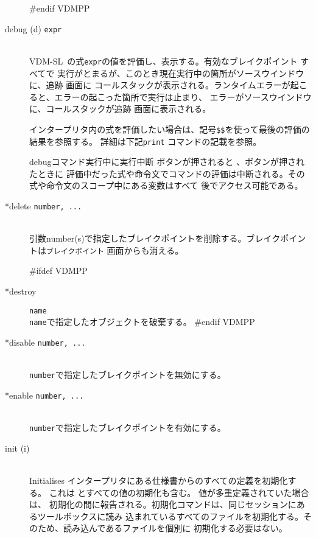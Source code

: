 \documentclass[\pformat,12pt]{article}
\newcommand{\vdmslpp}{VDM-SL}
\newcommand{\vdmslpp}{VDM++}
\newcommand{\guicmd}[1]{{\sf #1}}
\newcommand{\guicmd}[1]{{\gt #1}}
\begin{document}
\begin{description}
#endif VDMPP

\item[debug (d) {\tt expr}]  \mbox{}\\
  \vdmslpp\ の式{\tt expr}の値を評価し、表示する。有効なブレイクポイント すべてで
  実行がとまるが、このとき現在実行中の箇所が\guicmd{ソースウインドウ} に、\guicmd{追跡} 画面に
  コールスタックが表示される。ランタイムエラーが起こると、エラーの起こった箇所で実行は止まり、
  エラーが\guicmd{ソースウインドウ} に、コールスタックが\guicmd{追跡} 画面に表示される。
  
  インタープリタ内の式を評価したい場合は、記号{\tt \$\$}\index{\$\$}を使って最後の評価の結果を参照する。
  詳細は下記{\tt print} コマンドの記載を参照。
  
  debugコマンド実行中に\guicmd{実行中断} ボタンが押されると 、ボタンが押されたときに
  評価中だった式や命令文でコマンドの評価は中断される。その式や命令文のスコープ中にある変数はすべて
  後でアクセス可能である。
  
\item[*delete {\tt number, ...}] 
\mbox{}\\
  引数number(s)で指定したブレイクポイントを削除する。ブレイクポイントは\texttt{ブレイクポイント} 画面からも消える。
  
#ifdef VDMPP
\item[*destroy] {\tt name}\mbox{}\\
  {\tt name}で指定したオブジェクトを破棄する。
#endif VDMPP

\item[*disable \texttt{number, ...}]
\mbox{}\\
  \texttt{number}で指定したブレイクポイントを無効にする。

\item[*enable \texttt{number, ...}]
\mbox{}\\
  \texttt{number}で指定したブレイクポイントを有効にする。
  
\item[init (i)] \mbox{}\\ Initialises
  インタープリタにある仕様書からのすべての定義を初期化する。%
  これは%
   とすべての値の初期化も含む。%
  値が多重定義されていた場合は、%
  初期化の間に報告される。初期化コマンドは、同じセッションにあるツールボックスに読み%
  込まれているすべてのファイルを初期化する。そのため、読み込んであるファイルを個別に%
  初期化する必要はない。
  

\end{description}
\end{document}
